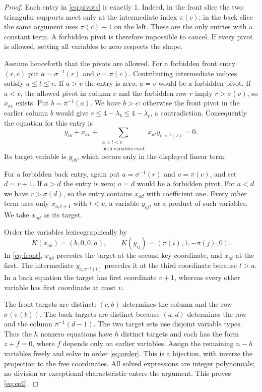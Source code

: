 \documentclass[11pt]{article}
\begin{document}
\begin{proof}
Each entry in \eqref{eq:pivots} is exactly 1. Indeed, in the front slice
the two triangular supports meet only at the intermediate index $\pi(c)$;
in the back slice the same argument uses $\pi(c)+1$ on the left.
These are the only entries with a constant term. A forbidden pivot is
therefore impossible to cancel. If every pivot is allowed, setting all
variables to zero respects the shape.

Assume henceforth that the pivots are allowed. For a forbidden front
entry $(r,c)$ put $a=\sigma^{-1}(r)$ and $v=\pi(c)$. Contributing
intermediate indices satisfy $a\leq t\leq v$. If $a>v$ the entry is
zero; $a=v$ would be a forbidden pivot. If $a<v$, the allowed pivot
in column $c$ and the forbidden row $r$ imply $r>\sigma(v)$, so
$x_{av}$ exists. Put $b=\pi^{-1}(a)$. We have $b>c$: otherwise the
front pivot in the earlier column $b$ would give
$r\leq4-\lambda_b\leq4-\lambda_c$, a contradiction.
Consequently the equation for this entry is
\begin{equation}\label{eq:front}
 y_{cb}+x_{av}
   +\sum_{\substack{a<t<v\\\text{both variables exist}}}
          x_{at}y_{c,\pi^{-1}(t)}=0.
\end{equation}
Its target variable is $y_{cb}$, which occurs only in the displayed
linear term.

For a forbidden back entry, again put $a=\sigma^{-1}(r)$ and
$v=\pi(c)$, and set $d=v+1$. If $a>d$ the entry is zero; $a=d$
would be a forbidden pivot. For $a<d$ we have $r>\sigma(d)$, so the
entry contains $x_{ad}$ with coefficient one. Every other term uses
only $x_{a,t+1}$ with $t<v$, a variable $y_{cj}$, or a product of
such variables. We take $x_{ad}$ as its target.

Order the variables lexicographically by
\begin{equation}\label{eq:order}
 K(x_{ab})=(b,0,0,a),\qquad
 K(y_{ij})=(\pi(i),1,-\pi(j),0).
\end{equation}
In \eqref{eq:front}, $x_{av}$ precedes the target at the second key
coordinate, and $x_{at}$ at the first. The intermediate
$y_{c,\pi^{-1}(t)}$ precedes it at the third coordinate because $t>a$.
In a back equation the target has first coordinate $v+1$, whereas
every other variable has first coordinate at most $v$.

The front targets are distinct: $(c,b)$ determines the column and the
row $\sigma(\pi(b))$. The back targets are distinct because $(a,d)$
determines the row and the column $\pi^{-1}(d-1)$. The two target
sets use disjoint variable types. Thus the $h$ nonzero equations have
$h$ distinct targets and each has the form $z+f=0$, where $f$ depends
only on earlier variables. Assign the remaining $n-h$ variables
freely and solve in order \eqref{eq:order}. This is a bijection, with
inverse the projection to the free coordinates. All solved expressions
are integer polynomials; no division or exceptional characteristic
enters the argument. This proves \eqref{eq:cell}.
\end{proof}
\end{document}
